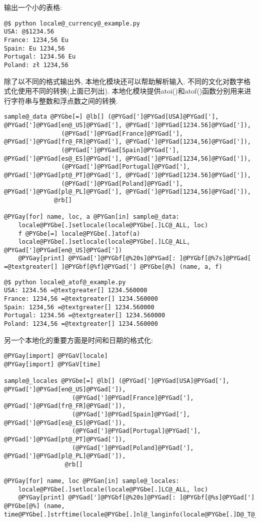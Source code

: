 \documentclass[a4paper,10pt,english]{manual}
\begin{document}
输出一个小的表格:

\begin{Verbatim}[commandchars=@\[\]]
@$ python locale@_currency@_example.py
USA: @$1234.56
France: 1234,56 Eu
Spain: Eu 1234,56
Portugal: 1234.56 Eu
Poland: zł 1234,56
\end{Verbatim}

除了以不同的格式输出外, 本地化模块还可以帮助解析输入. 不同的文化对数字格式化使用不同的转换(上面已列出). 本地化模块提供atoi()和atof()函数分别用来进行字符串与整数和浮点数之间的转换.

\begin{Verbatim}[commandchars=@\[\]]
sample@_data @PYGbe[=] @lb[] (@PYGad[']@PYGad[USA]@PYGad['], @PYGad[']@PYGad[en@_US]@PYGad['], @PYGad[']@PYGad[1234.56]@PYGad[']),
                (@PYGad[']@PYGad[France]@PYGad['], @PYGad[']@PYGad[fr@_FR]@PYGad['], @PYGad[']@PYGad[1234,56]@PYGad[']),
                (@PYGad[']@PYGad[Spain]@PYGad['], @PYGad[']@PYGad[es@_ES]@PYGad['], @PYGad[']@PYGad[1234,56]@PYGad[']),
                (@PYGad[']@PYGad[Portugal]@PYGad['], @PYGad[']@PYGad[pt@_PT]@PYGad['], @PYGad[']@PYGad[1234.56]@PYGad[']),
                (@PYGad[']@PYGad[Poland]@PYGad['], @PYGad[']@PYGad[pl@_PL]@PYGad['], @PYGad[']@PYGad[1234,56]@PYGad[']),
              @rb[]

@PYGay[for] name, loc, a @PYGan[in] sample@_data:
    locale@PYGbe[.]setlocale(locale@PYGbe[.]LC@_ALL, loc)
    f @PYGbe[=] locale@PYGbe[.]atof(a)
    locale@PYGbe[.]setlocale(locale@PYGbe[.]LC@_ALL, @PYGad[']@PYGad[en@_US]@PYGad['])
    @PYGay[print] @PYGad[']@PYGbf[@%20s]@PYGad[: ]@PYGbf[@%7s]@PYGad[ =@textgreater[] ]@PYGbf[@%f]@PYGad['] @PYGbe[@%] (name, a, f)
\end{Verbatim}

\begin{Verbatim}[commandchars=@\[\]]
@$ python locale@_atof@_example.py
USA: 1234.56 =@textgreater[] 1234.560000
France: 1234,56 =@textgreater[] 1234.560000
Spain: 1234,56 =@textgreater[] 1234.560000
Portugal: 1234.56 =@textgreater[] 1234.560000
Poland: 1234,56 =@textgreater[] 1234.560000
\end{Verbatim}

另一个本地化的重要方面是时间和日期的格式化:

\begin{Verbatim}[commandchars=@\[\]]
@PYGay[import] @PYGaV[locale]
@PYGay[import] @PYGaV[time]

sample@_locales @PYGbe[=] @lb[] (@PYGad[']@PYGad[USA]@PYGad['], @PYGad[']@PYGad[en@_US]@PYGad[']),
                   (@PYGad[']@PYGad[France]@PYGad['], @PYGad[']@PYGad[fr@_FR]@PYGad[']),
                   (@PYGad[']@PYGad[Spain]@PYGad['], @PYGad[']@PYGad[es@_ES]@PYGad[']),
                   (@PYGad[']@PYGad[Portugal]@PYGad['], @PYGad[']@PYGad[pt@_PT]@PYGad[']),
                   (@PYGad[']@PYGad[Poland]@PYGad['], @PYGad[']@PYGad[pl@_PL]@PYGad[']),
                 @rb[]

@PYGay[for] name, loc @PYGan[in] sample@_locales:
    locale@PYGbe[.]setlocale(locale@PYGbe[.]LC@_ALL, loc)
    @PYGay[print] @PYGad[']@PYGbf[@%20s]@PYGad[: ]@PYGbf[@%s]@PYGad['] @PYGbe[@%] (name, time@PYGbe[.]strftime(locale@PYGbe[.]nl@_langinfo(locale@PYGbe[.]D@_T@_FMT)))
\end{Verbatim}
\end{document}

